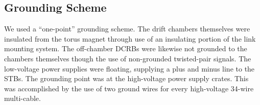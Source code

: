 \subsection{Grounding Scheme}

We used a ``one-point'' grounding scheme.  The drift chambers themselves were insulated
from the torus magnet through use of an insulating portion of the link
mounting system.  The off-chamber DCRBs were likewise not grounded
to the chambers themselves though the use of non-grounded twisted-pair signals.
The low-voltage power supplies were floating, supplying a plus and minus line 
to the STBs.
The grounding point was at the high-voltage power supply crates.  This was accomplished
by the use of two ground wires for every high-voltage 34-wire multi-cable.
